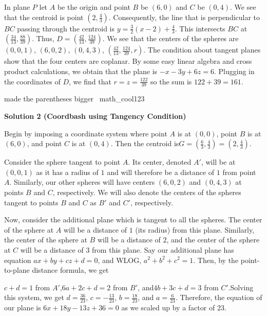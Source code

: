 \begin{enumerate}
In plane $P$ let $A$ be the origin and point $B$ be $(6,0)$ and $C$ be $(0,4)$. We see that the centroid is point $\left(2, \frac{4}{3}\right)$. Consequently, the line that is perpendicular to $BC$ passing through the centroid is $y= \frac{3}{2} (x - 2) + \frac{4}{3}$. This intersects $BC$ at $\left(\frac{34}{13}, \frac{88}{39}\right)$. Thus, $D= \left(\frac{42}{13}, \frac{124}{39}\right)$. We see that the centers of the spheres are $(0,0,1)$, $(6,0, 2)$, $(0,4,3)$, $\left(\frac{42}{13}, \frac{124}{39}, r\right)$. The condition about tangent planes show that the four centers are coplanar. By some easy linear algebra and cross product calculations, we obtain that the plane is $-x - 3y + 6z = 6$. Plugging in the coordinates of $D$, we find that $r=z= \frac{122}{39}$ so the sum is $122 + 39 = \boxed{161}$.

 made the parentheses bigger ~math\_cool123

 



\textbf{Solution 2 (Coordbash using Tangency Condition)}

Begin by imposing a coordinate system where point $A$ is at $(0,0)$, point $B$ is at $(6,0)$, and point $C$ is at $(0,4)$. Then the centroid is$G=\left(\frac{6}{3},\frac{4}{3}\right)=\left(2,\frac{4}{3}\right)$.

 Consider the sphere tangent to point $A$. Its center, denoted $A'$, will be at $(0,0,1)$ as it has a radius of $1$ and will therefore be a distance of $1$ from point $A$. Similarly, our other spheres will have centers $(6,0,2)$ and $(0,4,3)$ at points $B$ and $C$, respectively. We will also denote the centers of the spheres tangent to points $B$ and $C$ as $B'$ and $C'$, respectively.

 Now, consider the additional plane which is tangent to all the spheres. The center of the sphere at $A$ will be a distance of $1$ (its radius) from this plane. Similarly, the center of the sphere at $B$ will be a distance of $2$, and the center of the sphere at $C$ will be a distance of $3$ from this plane. Say our additional plane has equation $ax+by+cz+d=0$, and WLOG, $a^2+b^2+c^2=1$. Then, by the point-to-plane distance formula, we get

 $c+d=1$ from $A'$,$6a+2c+d=2$ from $B'$, and$4b+3c+d=3$ from $C'$.Solving this system, we get $d=\frac{36}{23}$, $c=-\frac{13}{23}$, $b=\frac{18}{23}$, and $a=\frac{6}{23}$. Therefore, the equation of our plane is $6x+18y-13z+36=0$ as we scaled up by a factor of $23$.


\end{enumerate}

